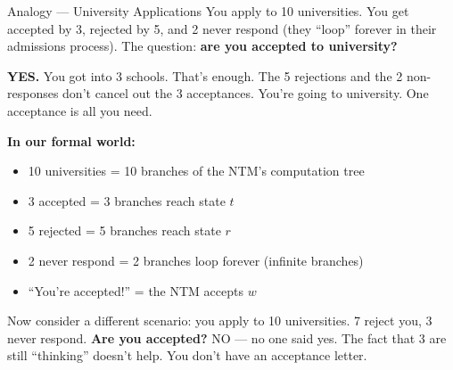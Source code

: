 \begin{notebox}{Analogy --- University Applications}
You apply to 10 universities. You get accepted by 3, rejected by 5, and
2 never respond (they ``loop'' forever in their admissions process). The
question: \textbf{are you accepted to university?}

\textbf{YES.} You got into 3 schools. That's enough. The 5 rejections and the
2 non-responses don't cancel out the 3 acceptances. You're going to university.
One acceptance is all you need.

\textbf{In our formal world:}
\begin{itemize}[nosep]
\item 10 universities = 10 branches of the NTM's computation tree
\item 3 accepted = 3 branches reach state $t$
\item 5 rejected = 5 branches reach state $r$
\item 2 never respond = 2 branches loop forever (infinite branches)
\item ``You're accepted!'' = the NTM accepts $w$
\end{itemize}

Now consider a different scenario: you apply to 10 universities. 7 reject you,
3 never respond. \textbf{Are you accepted?} NO --- no one said yes. The fact
that 3 are still ``thinking'' doesn't help. You don't have an acceptance letter.
\end{notebox}

